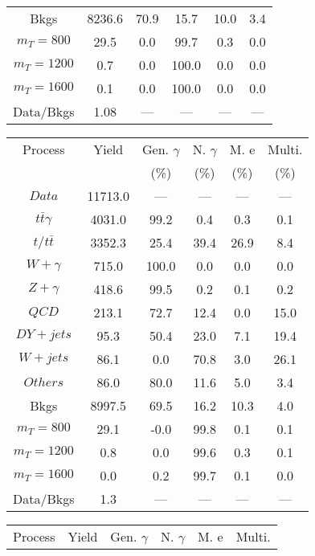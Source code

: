 \begin{figure}
\begin{minipage}[c]{0.32\textwidth}
{\begin{tabular}{cccccc}
Bkgs &  8236.6 &  70.9 &  15.7 &  10.0 &  3.4\\
$ m_{T} = 800 $ &  29.5 &  0.0 &  99.7 &  0.3 &  0.0\\
$ m_{T} = 1200 $ &  0.7 &  0.0 &  100.0 &  0.0 &  0.0\\
$ m_{T} = 1600 $ &  0.1 &  0.0 &  100.0 &  0.0 &  0.0\\
Data/Bkgs &  1.08 &  --- &  --- &  --- &  ---\\
\hline
\end{tabular}
}
\end{minipage}
\begin{minipage}[c]{0.32\textwidth}
\centering
\tiny{
\begin{tabular}{cccccc}
\hline
Process & Yield & Gen. $\gamma$ & N. $\gamma$ & M. e & Multi. \\
 &  & (\%) & (\%) & (\%) & (\%)  \\
\hline
                                                                      $ Data $ &  11713.0 &  --- &  --- &  --- &  ---\\
$ t\bar{t}\gamma $ &  4031.0 &  99.2 &  0.4 &  0.3 &  0.1\\
$ t/t\bar{t} $ &  3352.3 &  25.4 &  39.4 &  26.9 &  8.4\\
$ W+\gamma $ &  715.0 &  100.0 &  0.0 &  0.0 &  0.0\\
$ Z+\gamma $ &  418.6 &  99.5 &  0.2 &  0.1 &  0.2\\
$ QCD $ &  213.1 &  72.7 &  12.4 &  0.0 &  15.0\\
$ DY+jets $ &  95.3 &  50.4 &  23.0 &  7.1 &  19.4\\
$ W+jets $ &  86.1 &  0.0 &  70.8 &  3.0 &  26.1\\
$ Others $ &  86.0 &  80.0 &  11.6 &  5.0 &  3.4\\
Bkgs &  8997.5 &  69.5 &  16.2 &  10.3 &  4.0\\
$ m_{T} = 800 $ &  29.1 &  -0.0 &  99.8 &  0.1 &  0.1\\
$ m_{T} = 1200 $ &  0.8 &  0.0 &  99.6 &  0.3 &  0.1\\
$ m_{T} = 1600 $ &  0.0 &  0.2 &  99.7 &  0.1 &  0.0\\
Data/Bkgs &  1.3 &  --- &  --- &  --- &  ---\\
\hline
\end{tabular}
}
\end{minipage}
\begin{minipage}[c]{0.32\textwidth}
\centering
\tiny{
\begin{tabular}{cccccc}
\hline
Process & Yield & Gen. $\gamma$ & N. $\gamma$ & M. e & Multi. \\

\end{tabular}}
\end{minipage}
\end{figure}
